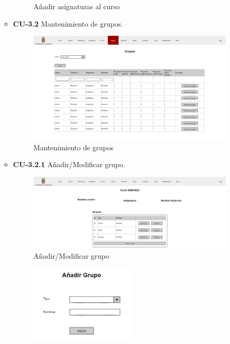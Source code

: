 \begin{itemize}
\begin{itemize}
\begin{figure}[!h]
		\caption{Añadir asignaturas al curso}
		\end{figure}
		\FloatBarrier
\newpage
		\item \textbf{CU-3.2} Mantenimiento de grupos.
		\begin{figure}[!h]
		\centering
		\includegraphics[width=\textwidth]{../img/Anexos/Vistas/grupos.png}
		\caption{Mantenimiento de grupos}
		\end{figure}
		\FloatBarrier
		\item \textbf{CU-3.2.1} Añadir/Modificar grupo.
		\begin{figure}[!h]
		\centering
		\includegraphics[width=\textwidth]{../img/Anexos/Vistas/addmod_grupo.png}
		\caption{Añadir/Modificar grupo}
		\end{figure}
		\FloatBarrier
		\begin{figure}[!h]
		\centering
		\includegraphics[width=0.5\textwidth]{../img/Anexos/Vistas/add_grupo.png}

\end{figure}
\end{itemize}
\end{itemize}
